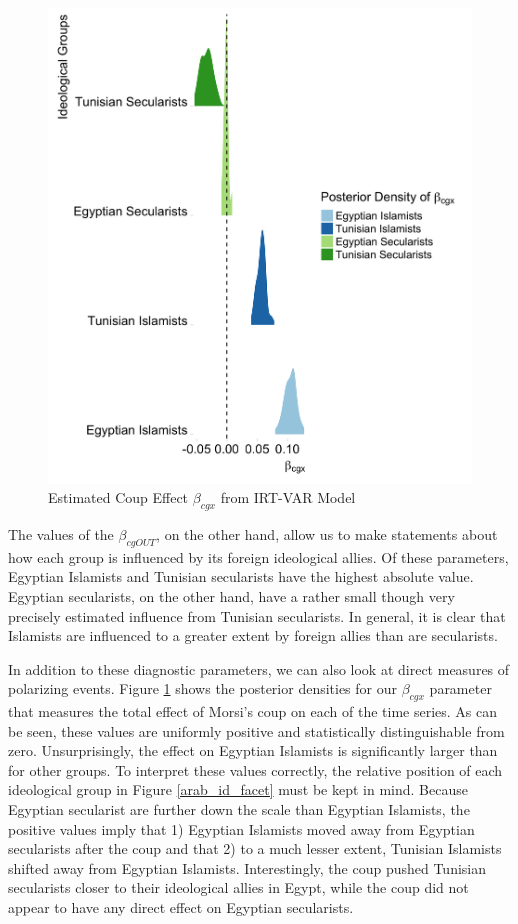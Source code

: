 \documentclass[12pt]{article}
\begin{document}
 \begin{figure}[!h]
	\centering
	\caption{Estimated Coup Effect $\beta_{cgx}$ from IRT-VAR Model}\label{betax}
	\centering
	\includegraphics[width=.9\linewidth]{betax}
\end{figure}

The values of the $\beta_{cgOUT}$, on the other hand, allow us to make statements about how each group is influenced by its foreign ideological allies. Of these parameters, Egyptian Islamists and Tunisian secularists have the highest absolute value. Egyptian secularists, on the other hand, have a rather small though very precisely estimated influence from Tunisian secularists. In general, it is clear that Islamists are influenced to a greater extent by foreign allies than are secularists.

In addition to these diagnostic parameters, we can also look at direct measures of polarizing events. Figure \ref{betax} shows the posterior densities for our $\beta_{cgx}$ parameter that measures the total effect of Morsi's coup on each of the time series. As can be seen, these values are uniformly positive and statistically distinguishable from zero. Unsurprisingly, the effect on Egyptian Islamists is significantly larger than for other groups. To interpret these values correctly, the relative position of each ideological group in Figure \ref{arab_id_facet} must be kept in mind. Because Egyptian secularist are further down the scale than Egyptian Islamists, the positive values imply that 1) Egyptian Islamists moved away from Egyptian secularists after the coup and that 2) to a much lesser extent, Tunisian Islamists shifted away from Egyptian Islamists. Interestingly, the coup pushed Tunisian secularists closer to their ideological allies in Egypt, while the coup did not appear to have any direct effect on Egyptian secularists. 
\end{document}
